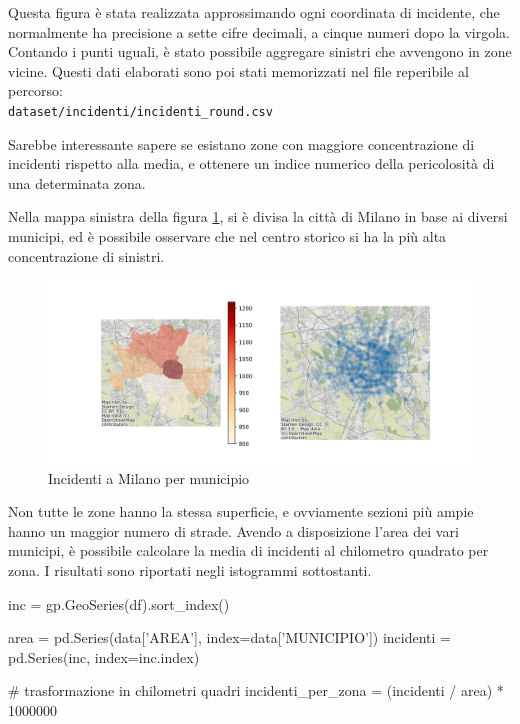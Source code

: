 \documentclass[a4paper,12pt]{report}
\newcommand{\filenamestyle}[1]{\texttt{#1}}
\begin{document}
Questa figura è stata realizzata approssimando ogni coordinata di incidente, che  
normalmente ha precisione a sette cifre decimali, a cinque numeri dopo la virgola. 
Contando i punti uguali, è stato possibile aggregare sinistri che avvengono in zone 
vicine. 
Questi dati elaborati sono poi stati memorizzati nel file reperibile al 
percorso:\\ 
\filenamestyle{dataset/incidenti/incidenti\_round.csv} 

Sarebbe interessante sapere se esistano zone con maggiore concentrazione 
di incidenti rispetto alla media, e ottenere un indice numerico 
della pericolosità di una determinata zona. 

Nella mappa sinistra della figura \ref{fig:heatmap-municipi}, si è divisa 
la città di Milano in base ai diversi municipi, ed è possibile 
osservare che nel centro storico si ha la più alta concentrazione di sinistri. 

\begin{figure}
    \includegraphics[width=\linewidth]{../src/municipi_milano/incidenti_municipio.png}
    \caption{Incidenti a Milano per municipio}
    \label{fig:heatmap-municipi}
\end{figure}

Non tutte le zone hanno la stessa superficie, e ovviamente sezioni più ampie hanno un maggior 
numero di strade. Avendo a disposizione l'area dei vari municipi, 
è possibile calcolare la media di incidenti al chilometro quadrato per zona. 
I risultati sono riportati negli istogrammi sottostanti. 

\begin{code}    
inc = gp.GeoSeries(df).sort_index()

area = pd.Series(data['AREA'], index=data['MUNICIPIO'])
incidenti = pd.Series(inc, index=inc.index)

# trasformazione in chilometri quadri
incidenti_per_zona = (incidenti / area) * 1000000 
\end{code}
\end{document}
